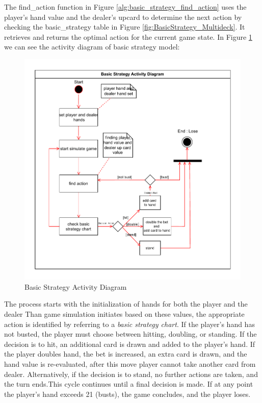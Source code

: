 \documentclass[a4paper,12pt]{report}
\begin{document}
The find\_action function in Figure \ref{alg:basic_strategy_find_action} uses the player's hand value and the dealer's upcard to determine the next action by checking the basic\_strategy table in Figure \ref{fig:BasicStrategy_Multideck}. It retrieves and returns the optimal action for the current game state. In Figure \ref{fig:BasicStrategy_activitydiagram} we can see the activity diagram of basic strategy model:

\begin{figure}[h]
\begin{center}
\includegraphics[scale=0.75,keepaspectratio]{figures/basic_strategy_activity_diagram.pdf}
\caption{Basic Strategy Activity Diagram} 
\label{fig:BasicStrategy_activitydiagram}
\end{center}
\end{figure}

The process starts with the initialization of hands for both the player and the dealer Than game simulation initiates based on these values, the appropriate action is identified by referring to a \textit{basic strategy chart}. If the player's hand has not busted, the player must choose between hitting, doubling, or standing. If the decision is to hit, an additional card is drawn and added to the player's hand. If the player doubles hand, the bet is increased, an extra card is drawn, and the hand value is re-evaluated, after this move player cannot take another card from dealer. Alternatively, if the decision is to stand, no further actions are taken, and the turn ends.This cycle continues until a final decision is made. If at any point the player's hand exceeds 21 (busts), the game concludes, and the player loses.
\end{document}
